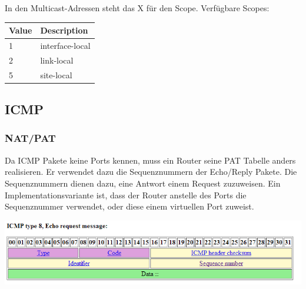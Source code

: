In den Multicast-Adressen steht das X für den Scope. Verfügbare Scopes:

\begin{tabular}[h]{|l|l|}
	\hline
	\textbf{Value} & \textbf{Description} \\
	\hline
	1 & interface-local \\
	2 & link-local \\
	5 & site-local \\
	\hline
\end{tabular}


\subsection{ICMP}

\subsubsection{NAT/PAT}

Da ICMP Pakete keine Ports kennen, muss ein Router seine PAT Tabelle anders
realisieren. Er verwendet dazu die Sequenznummern der Echo/Reply Pakete. Die Sequenznummern
dienen dazu, eine Antwort einem Request zuzuweisen. Ein Implementationsvariante
ist, dass der Router anstelle des Ports die Sequenznummer verwendet, oder diese
einem virtuellen Port zuweist.

\includegraphics[scale=0.8]{media/ICMPRequest.png}
